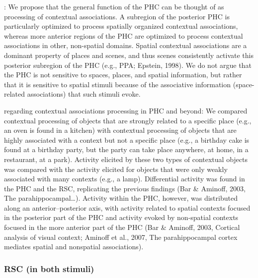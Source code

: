 \documentclass[english]{article}
\begin{document}
\citep{aminoff2006parahippocampal}: We propose that the general function of the
PHC can be thought of as processing of contextual associations. A subregion of
the posterior PHC is particularly optimized to process spatially organized
contextual associations, whereas more anterior regions of the PHC are optimized
to process contextual associations in other, non-spatial domains.
Spatial contextual associations are a dominant property of places and scenes,
and thus scenes consistently activate this posterior subregion of the PHC (e.g.,
PPA; Epstein, 1998). We do not argue that the PHC is not sensitive to spaces,
places, and spatial information, but rather that it is sensitive to spatial
stimuli because of the associative information (space-related associations) that
such stimuli evoke.

\citep{aminoff2006parahippocampal} regarding contextual associations processing
in PHC and beyond: We compared contextual processing of objects that are
strongly related to a specific place (e.g., an oven is found in a kitchen) with
contextual processing of objects that are highly associated with a context but
not a specific place (e.g., a birthday cake is found at a birthday party, but
the party can take place anywhere, at home, in a restaurant, at a park).
Activity elicited by these two types of contextual objects was compared with the
activity elicited for objects that were only weakly associated with many
contexts (e.g., a lamp). Differential activity was found in the PHC and the RSC,
replicating the previous findings (Bar \& Aminoff, 2003, The
parahippocampal\dots).
\citep{aminoff2006parahippocampal} Activity within the PHC, however, was
distributed along an anterior–posterior axis, with activity related to spatial
contexts focused in the posterior part of the PHC and activity evoked by
non-spatial contexts focused in the more anterior part of the PHC (Bar \&
Aminoff, 2003, Cortical analysis of visual context; Aminoff et al., 2007, The
parahippocampal cortex mediates spatial and nonspatial associations).


\subsubsection{RSC (in both stimuli)}

\end{document}
